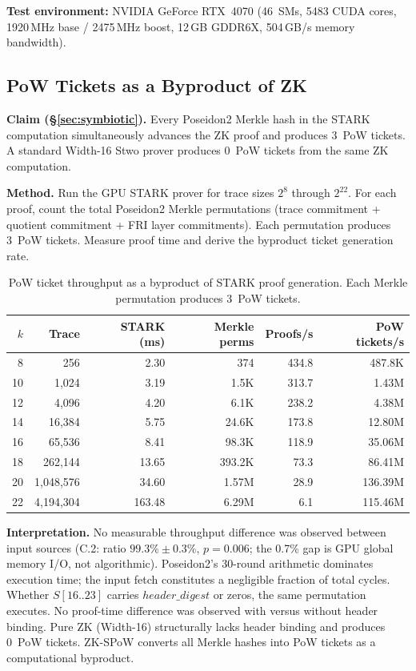 \documentclass[11pt,a4paper]{article}
\begin{document}
\textbf{Test environment:} NVIDIA GeForce RTX~4070 (46~SMs, 5483 CUDA cores, 1920\,MHz base / 2475\,MHz boost, 12\,GB GDDR6X, 504\,GB/s memory bandwidth).

\subsection{PoW Tickets as a Byproduct of ZK}
\label{sec:gpu-freetickets}

\textbf{Claim (\S\ref{sec:symbiotic}).} Every Poseidon2 Merkle hash in the STARK computation simultaneously advances the ZK proof and produces 3~PoW tickets. A standard Width-16 Stwo prover produces 0~PoW tickets from the same ZK computation.

\textbf{Method.} Run the GPU STARK prover for trace sizes $2^8$ through $2^{22}$. For each proof, count the total Poseidon2 Merkle permutations (trace commitment + quotient commitment + FRI layer commitments). Each permutation produces 3~PoW tickets. Measure proof time and derive the byproduct ticket generation rate.

\begin{table}[h]
\centering
\small
\begin{tabular}{@{}rrrrrr@{}}
\toprule
$k$ & Trace & STARK (ms) & Merkle perms & Proofs/s & PoW tickets/s \\
\midrule
8 & 256 & 2.30 & 374 & 434.8 & 487.8K \\
10 & 1{,}024 & 3.19 & 1.5K & 313.7 & 1.43M \\
12 & 4{,}096 & 4.20 & 6.1K & 238.2 & 4.38M \\
14 & 16{,}384 & 5.75 & 24.6K & 173.8 & 12.80M \\
16 & 65{,}536 & 8.41 & 98.3K & 118.9 & 35.06M \\
18 & 262{,}144 & 13.65 & 393.2K & 73.3 & 86.41M \\
20 & 1{,}048{,}576 & 34.60 & 1.57M & 28.9 & 136.39M \\
22 & 4{,}194{,}304 & 163.48 & 6.29M & 6.1 & 115.46M \\
\bottomrule
\end{tabular}
\caption{PoW ticket throughput as a byproduct of STARK proof generation. Each Merkle permutation produces 3~PoW tickets.}
\label{tab:free-tickets}
\end{table}

\textbf{Interpretation.} No measurable throughput difference was observed between input sources (C.2: ratio $99.3\% \pm 0.3\%$, $p{=}0.006$; the 0.7\% gap is GPU global memory I/O, not algorithmic). Poseidon2's 30-round arithmetic dominates execution time; the input fetch constitutes a negligible fraction of total cycles. Whether $S[16..23]$ carries $\mathit{header\_digest}$ or zeros, the same permutation executes. No proof-time difference was observed with versus without header binding. Pure ZK (Width-16) structurally lacks header binding and produces 0~PoW tickets. ZK-SPoW converts all Merkle hashes into PoW tickets as a computational byproduct.
\end{document}
